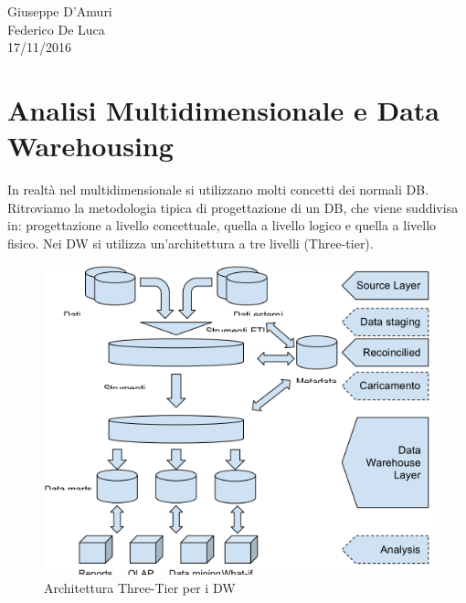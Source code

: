 \begin{flushright}Giuseppe D'Amuri\\Federico De Luca\\17/11/2016\end{flushright}


\section{Analisi Multidimensionale e Data Warehousing}

In realtà nel multidimensionale si utilizzano molti concetti dei normali DB. Ritroviamo la metodologia tipica di progettazione di un DB, che viene suddivisa in: progettazione a livello concettuale, quella a livello logico e quella a livello fisico. Nei DW si utilizza un'architettura a tre livelli (Three-tier).  

\begin{center}
\begin{figure}[H]
\centering
\includegraphics[scale=0.8]{figures/DW_three_tier.png}
\caption{Architettura Three-Tier per i DW}
\end{figure}
\end{center}

